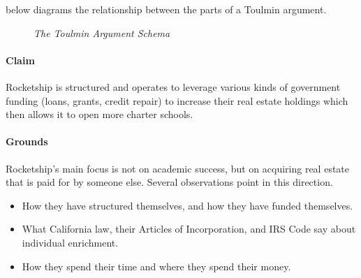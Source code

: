  below diagrams the relationship between the parts of a Toulmin argument.

\begin{figure}[htbp]
  \caption{\textit{The Toulmin Argument Schema}}\label{fig:toulmin-arg}%
  \centering%
\end{figure}

\paragraph{Claim}
Rocketship is structured and operates to leverage various kinds of government funding (loans, grants, credit repair) to increase their real estate holdings which then allows it to open more charter schools.

\paragraph{Grounds}
Rocketship's main focus is not on academic success, but on acquiring real estate that is paid for by someone else. Several observations point in this direction.
\begin{itemize}
  \item How they have structured themselves, and  how they have funded themselves.
  \item What California law, their Articles of Incorporation, and IRS Code say about individual enrichment.
  \item How they spend their time and where they spend their money.
\end{itemize}

